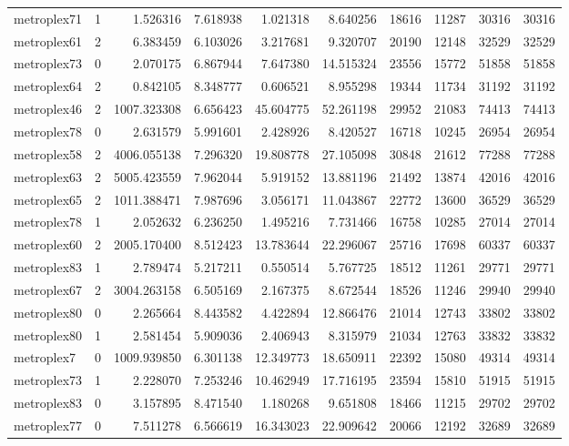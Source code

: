 \begin{longtable}{|l|r|r|r|r|r|r|r|r|r|}
metroplex71 & 1 & 1.526316 & 7.618938 & 1.021318 & 8.640256 & 18616 & 11287 & 30316 & 30316 \\
metroplex61 & 2 & 6.383459 & 6.103026 & 3.217681 & 9.320707 & 20190 & 12148 & 32529 & 32529 \\
metroplex73 & 0 & 2.070175 & 6.867944 & 7.647380 & 14.515324 & 23556 & 15772 & 51858 & 51858 \\
metroplex64 & 2 & 0.842105 & 8.348777 & 0.606521 & 8.955298 & 19344 & 11734 & 31192 & 31192 \\
metroplex46 & 2 & 1007.323308 & 6.656423 & 45.604775 & 52.261198 & 29952 & 21083 & 74413 & 74413 \\
metroplex78 & 0 & 2.631579 & 5.991601 & 2.428926 & 8.420527 & 16718 & 10245 & 26954 & 26954 \\
metroplex58 & 2 & 4006.055138 & 7.296320 & 19.808778 & 27.105098 & 30848 & 21612 & 77288 & 77288 \\
metroplex63 & 2 & 5005.423559 & 7.962044 & 5.919152 & 13.881196 & 21492 & 13874 & 42016 & 42016 \\
metroplex65 & 2 & 1011.388471 & 7.987696 & 3.056171 & 11.043867 & 22772 & 13600 & 36529 & 36529 \\
metroplex78 & 1 & 2.052632 & 6.236250 & 1.495216 & 7.731466 & 16758 & 10285 & 27014 & 27014 \\
metroplex60 & 2 & 2005.170400 & 8.512423 & 13.783644 & 22.296067 & 25716 & 17698 & 60337 & 60337 \\
metroplex83 & 1 & 2.789474 & 5.217211 & 0.550514 & 5.767725 & 18512 & 11261 & 29771 & 29771 \\
metroplex67 & 2 & 3004.263158 & 6.505169 & 2.167375 & 8.672544 & 18526 & 11246 & 29940 & 29940 \\
metroplex80 & 0 & 2.265664 & 8.443582 & 4.422894 & 12.866476 & 21014 & 12743 & 33802 & 33802 \\
metroplex80 & 1 & 2.581454 & 5.909036 & 2.406943 & 8.315979 & 21034 & 12763 & 33832 & 33832 \\
metroplex7 & 0 & 1009.939850 & 6.301138 & 12.349773 & 18.650911 & 22392 & 15080 & 49314 & 49314 \\
metroplex73 & 1 & 2.228070 & 7.253246 & 10.462949 & 17.716195 & 23594 & 15810 & 51915 & 51915 \\
metroplex83 & 0 & 3.157895 & 8.471540 & 1.180268 & 9.651808 & 18466 & 11215 & 29702 & 29702 \\
metroplex77 & 0 & 7.511278 & 6.566619 & 16.343023 & 22.909642 & 20066 & 12192 & 32689 & 32689 \\

\end{longtable}
